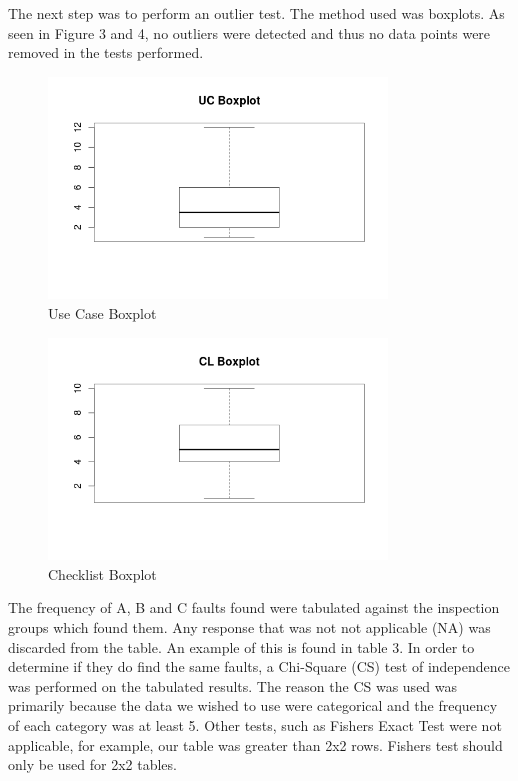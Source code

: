 \documentclass[10pt,twocolumn]{article}
\begin{document}
The next step was to perform an outlier test. The method used was boxplots. As seen in Figure 3 and 4, no outliers were detected and thus no data points were removed in the tests performed. 

\begin{figure}[ht]
\centering
\includegraphics[width=90mm]{uc_box.png}
\caption{Use Case Boxplot}
\end{figure}

\begin{figure}[ht]
\centering
\includegraphics[width=90mm]{cl_box.png}
\caption{Checklist Boxplot}
\end{figure}


The frequency of A, B and C faults found were tabulated against the inspection groups which found them. Any response that was not not applicable (NA) was discarded from the table. An example of this is found in table 3. In order to determine if they do find the same faults, a Chi-Square (CS) test of independence was performed on the tabulated results. The reason the CS was used was primarily because the data we wished to use were categorical and the frequency of each category was at least 5. Other tests, such as Fishers Exact Test were not applicable, for example, our table was greater than 2x2 rows. Fishers test should only be used for 2x2 tables.
\end{document}
